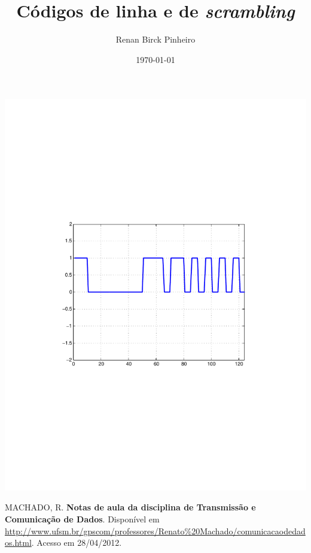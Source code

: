 \documentclass[a4paper,10pt]{article}
\title{Códigos de linha e de \textit{scrambling}}
\author{Renan Birck Pinheiro}
\date{\today}
\begin{document}
\maketitle

\includegraphics{bitstream.pdf}
\begin{thebibliography}{99}
 MACHADO, R. {\bf Notas de aula da disciplina de Transmissão e Comunicação de Dados}. Disponível em \url{http://www.ufsm.br/gpscom/professores/Renato\%20Machado/comunicacaodedados.html}. Acesso em 28/04/2012.
\end{thebibliography}
\end{document}
